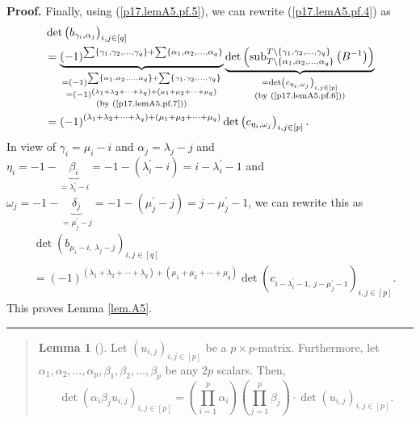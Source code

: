 \documentclass[numbers=enddot,12pt,final,onecolumn,notitlepage]{scrartcl}%
\newenvironment{statement}{\begin{quote}}{\end{quote}}
\theoremstyle{definition}
\newtheorem{lem}[theo]{Lemma}
\newenvironment{lemmain}[1][]
{\begin{statement}\begin{lem}[#1]}
{\end{lem}\end{statement}}
\newenvironment{proof}[1][Proof]{\noindent\textbf{#1.} }{\ \rule{0.5em}{0.5em}}
\newenvironment{lemmain}[1][Proof]{\noindent\textbf{#1.} }{\ \rule{0.5em}{0.5em}}
\let\sumnonlimits\sum
\let\prodnonlimits\prod
\renewcommand{\sum}{\sumnonlimits\limits}
\renewcommand{\prod}{\prodnonlimits\limits}
\begin{document}
\begin{enumerate}
\begin{proof}
Finally, using (\ref{p17.lemA5.pf.5}), we can rewrite (\ref{p17.lemA5.pf.4})
as%
\begin{align*}
&  \det\left(  b_{\gamma_{i},\alpha_{j}}\right)  _{i,j\in\left[  q\right]  }\\
&  =\underbrace{\left(  -1\right)  ^{\sum\left\{  \gamma_{1},\gamma_{2}%
,\ldots,\gamma_{q}\right\}  +\sum\left\{  \alpha_{1},\alpha_{2},\ldots
,\alpha_{q}\right\}  }}_{\substack{=\left(  -1\right)  ^{\sum\left\{
\alpha_{1},\alpha_{2},\ldots,\alpha_{q}\right\}  +\sum\left\{  \gamma
_{1},\gamma_{2},\ldots,\gamma_{q}\right\}  }\\=\left(  -1\right)  ^{\left(
\lambda_{1}+\lambda_{2}+\cdots+\lambda_{q}\right)  +\left(  \mu_{1}+\mu
_{2}+\cdots+\mu_{q}\right)  }\\\text{(by (\ref{p17.lemA5.pf.7}))}%
}}\underbrace{\det\left(  \operatorname*{sub}\nolimits_{T\setminus\left\{
\alpha_{1},\alpha_{2},\ldots,\alpha_{q}\right\}  }^{T\setminus\left\{
\gamma_{1},\gamma_{2},\ldots,\gamma_{q}\right\}  }\left(  B^{-1}\right)
\right)  }_{\substack{=\det\left(  c_{\eta_{i},\omega_{j}}\right)
_{i,j\in\left[  p\right]  }\\\text{(by (\ref{p17.lemA5.pf.6}))}}}\\
&  =\left(  -1\right)  ^{\left(  \lambda_{1}+\lambda_{2}+\cdots+\lambda
_{q}\right)  +\left(  \mu_{1}+\mu_{2}+\cdots+\mu_{q}\right)  }\det\left(
c_{\eta_{i},\omega_{j}}\right)  _{i,j\in\left[  p\right]  }.
\end{align*}
In view of $\gamma_{i}=\mu_{i}-i$ and $\alpha_{j}=\lambda_{j}-j$ and $\eta
_{i}=-1-\underbrace{\beta_{i}}_{=\lambda_{i}^{\prime}-i}=-1-\left(
\lambda_{i}^{\prime}-i\right)  =i-\lambda_{i}^{\prime}-1$ and $\omega
_{j}=-1-\underbrace{\delta_{j}}_{=\mu_{j}^{\prime}-j}=-1-\left(  \mu
_{j}^{\prime}-j\right)  =j-\mu_{j}^{\prime}-1$, we can rewrite this as%
\begin{align*}
&  \det\left(  b_{\mu_{i}-i,\ \lambda_{j}-j}\right)  _{i,j\in\left[  q\right]
}\\
&  =\left(  -1\right)  ^{\left(  \lambda_{1}+\lambda_{2}+\cdots+\lambda
_{q}\right)  +\left(  \mu_{1}+\mu_{2}+\cdots+\mu_{q}\right)  }\det\left(
c_{i-\lambda_{i}^{\prime}-1,\ j-\mu_{j}^{\prime}-1}\right)  _{i,j\in\left[
p\right]  }.
\end{align*}
This proves Lemma \ref{lem.A5}.
\end{proof}

\begin{lemmain}
\label{lem.A6}Let $\left(  u_{i,j}\right)  _{i,j\in\left[  p\right]  }$ be a
$p\times p$-matrix. Furthermore, let $\alpha_{1},\alpha_{2},\ldots,\alpha
_{p},\beta_{1},\beta_{2},\ldots,\beta_{p}$ be any $2p$ scalars. Then,%
\[
\det\left(  \alpha_{i}\beta_{j}u_{i,j}\right)  _{i,j\in\left[  p\right]
}=\left(  \prod_{i=1}^{p}\alpha_{i}\right)  \left(  \prod_{j=1}^{p}\beta
_{j}\right)  \cdot\det\left(  u_{i,j}\right)  _{i,j\in\left[  p\right]  }.
\]


\end{lemmain}
\end{enumerate}
\end{document}
